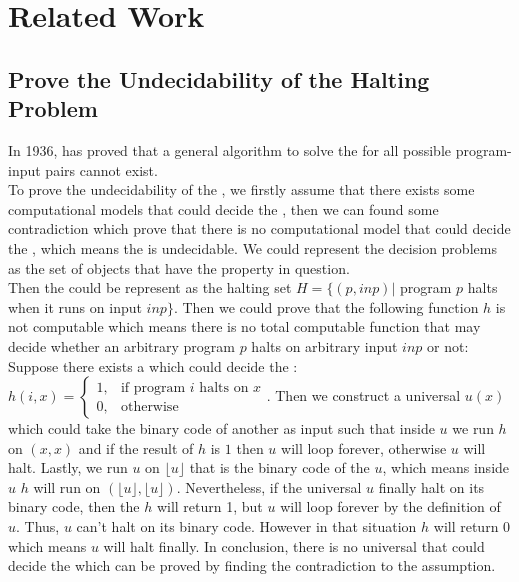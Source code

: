 \section{Related Work}
\subsection{Prove the Undecidability of the Halting Problem}
In 1936,  has proved that a general algorithm to solve the  for all possible program-input pairs cannot exist\cite{_halting_2015}.\\
To prove the undecidability of the , we firstly assume that there exists some computational models that could decide the , then we can found some contradiction which prove that there is no
computational model that could decide the , which means the  is undecidable. 
We could represent the decision problems as the set of objects that have the property in question.\\
Then the  could be represent as the halting set $H = \{(p,inp)|$ program $p$ halts when it runs on input $inp\}$. 
Then we could prove that the following function $h$ is not computable which means there is no total computable function that may decide whether an arbitrary program $p$
halts on arbitrary input $inp$ or not\cite{_computability_2015}:\\
\label{definition of U}Suppose there exists a  which could decide the : $h (i,x) = \begin{cases} 1, & \mbox{if program }i\mbox{ halts on } x \\ 0, & \mbox{otherwise}\end{cases}$.
Then we construct a universal  $u (x)$ which could take the binary code of another  as input such that inside $u$ we run $h$ on $(x, x)$ 
and if the result of $h$ is $1$ then $u$ will loop forever, otherwise $u$ will halt. Lastly, we run $u$ on $\lfloor u\rfloor$ that is the binary code of
the  $u$, which means inside $u$  $h$ will run on $(\lfloor u\rfloor,\lfloor u\rfloor)$. 
Nevertheless, if the universal  $u$ finally halt on its binary code, then the  $h$ will return 1, but $u$ will loop forever by the definition of  $u$.
Thus, $u$ can’t halt on its binary code. 
However in that situation $h$ will return 0 which means $u$ will halt finally. 
In conclusion, there is no universal  that could decide the  which can be proved by finding the contradiction to the assumption\cite{_halting_2015}.
